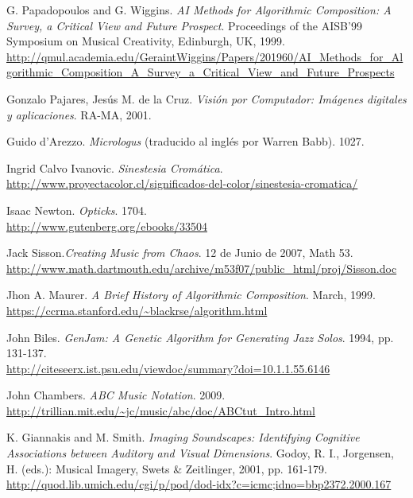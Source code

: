 \begin{thebibliography}{9}
 G. Papadopoulos and G. Wiggins. \emph{AI Methods for Algorithmic Composition: A Survey, a Critical View  and Future Prospect}. Proceedings of the AISB’99 Symposium on Musical Creativity, Edinburgh, UK, 1999.\\
 \url{http://qmul.academia.edu/GeraintWiggins/Papers/201960/AI_Methods_for_Algorithmic_Composition_A_Survey_a_Critical_View_and_Future_Prospects}

 Gonzalo Pajares, Jesús M. de la Cruz. \emph{Visión por Computador: Imágenes digitales y aplicaciones}. RA-MA, 2001.

 Guido d'Arezzo. \emph{Micrologus} (traducido al inglés por Warren Babb). 1027.

 Ingrid Calvo Ivanovic. \emph{Sinestesia Cromática}.\\
 \url{http://www.proyectacolor.cl/significados-del-color/sinestesia-cromatica/}

 Isaac Newton. \emph{Opticks}. 1704.\\
 \url{http://www.gutenberg.org/ebooks/33504}

Jack Sisson.\emph{Creating Music from Chaos}. 12 de Junio de 2007, Math 53.\\
\url{http://www.math.dartmouth.edu/archive/m53f07/public_html/proj/Sisson.doc}

 Jhon A. Maurer. \emph{A Brief History of Algorithmic Composition}. March, 1999.\\
 \url{https://ccrma.stanford.edu/~blackrse/algorithm.html}

 John Biles. \emph{GenJam: A Genetic Algorithm for Generating Jazz Solos}. 1994, pp. 131-137.\\
 \url{http://citeseerx.ist.psu.edu/viewdoc/summary?doi=10.1.1.55.6146}

  John Chambers. \emph{ABC Music Notation}. 2009.\\
  \url{http://trillian.mit.edu/~jc/music/abc/doc/ABCtut_Intro.html}
 
 K. Giannakis and M. Smith. \emph{Imaging Soundscapes: Identifying Cognitive Associations between Auditory and Visual Dimensions}. Godoy, R. I., Jorgensen, H. (eds.): Musical Imagery, Swets \& Zeitlinger, 2001, pp. 161-179.\\
 \url{http://quod.lib.umich.edu/cgi/p/pod/dod-idx?c=icmc;idno=bbp2372.2000.167}


\end{thebibliography}
